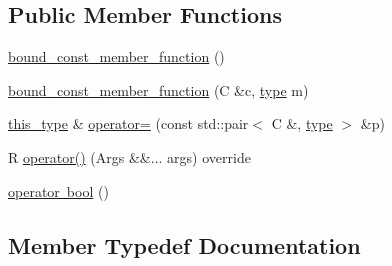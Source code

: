 \subsection*{Public Member Functions}
\begin{DoxyCompactItemize}
\item 
\mbox{\hyperlink{classfakeit_1_1bound__const__member__function_3_01C_00_01R_07Args_8_8_8_08_4_ab2bc42d6547a8e128d9d643b98c72601}{bound\+\_\+const\+\_\+member\+\_\+function}} ()
\item 
\mbox{\hyperlink{classfakeit_1_1bound__const__member__function_3_01C_00_01R_07Args_8_8_8_08_4_a5bcef539a302dff604324477054c456f}{bound\+\_\+const\+\_\+member\+\_\+function}} (C \&c, \mbox{\hyperlink{classfakeit_1_1bound__const__member__function_3_01C_00_01R_07Args_8_8_8_08_4_a0226a7415039666838a9beafb0acc657}{type}} m)
\item 
\mbox{\hyperlink{classfakeit_1_1bound__const__member__function_3_01C_00_01R_07Args_8_8_8_08_4_abd7a4a6a7f91724a7279dce10ce7941a}{this\+\_\+type}} \& \mbox{\hyperlink{classfakeit_1_1bound__const__member__function_3_01C_00_01R_07Args_8_8_8_08_4_af1f9cd08e67582f7a65f6afeb027937d}{operator=}} (const std\+::pair$<$ C \&, \mbox{\hyperlink{classfakeit_1_1bound__const__member__function_3_01C_00_01R_07Args_8_8_8_08_4_a0226a7415039666838a9beafb0acc657}{type}} $>$ \&p)
\item 
R \mbox{\hyperlink{classfakeit_1_1bound__const__member__function_3_01C_00_01R_07Args_8_8_8_08_4_a00ad59bf7f82fd9f240ba4fc405667ad}{operator()}} (Args \&\&... args) override
\item 
\mbox{\hyperlink{classfakeit_1_1bound__const__member__function_3_01C_00_01R_07Args_8_8_8_08_4_a8b21f3dd6914da48cada5165beb940b4}{operator bool}} ()
\end{DoxyCompactItemize}


\subsection{Member Typedef Documentation}
\mbox{\label{classfakeit_1_1bound__const__member__function_3_01C_00_01R_07Args_8_8_8_08_4_abd7a4a6a7f91724a7279dce10ce7941a}} 
